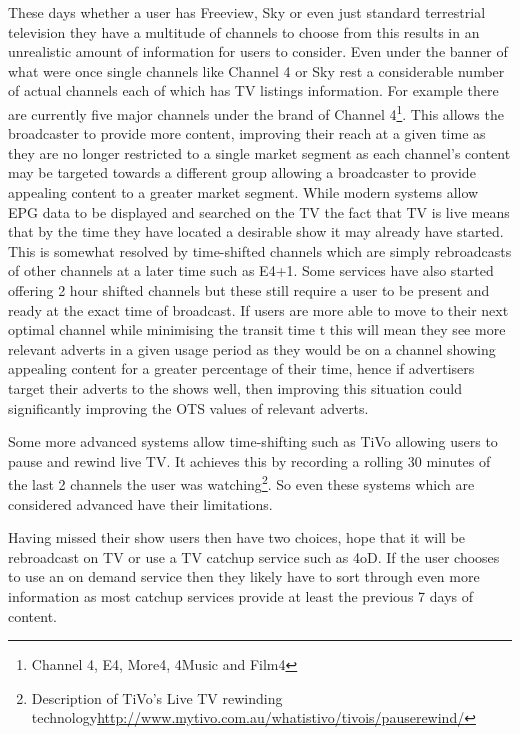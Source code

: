 These days whether a user has Freeview, Sky or even just standard terrestrial television they have a multitude of channels to choose from this results in an unrealistic amount of information for users to consider\citep{informationOverload}. Even under the banner of what were once single channels like Channel 4 or Sky rest a considerable number of actual channels each of which has TV listings information. For example there are currently five major channels under the brand of Channel 4\footnote{Channel 4, E4, More4, 4Music and Film4}. This allows the broadcaster to provide more content, improving their reach at a given time as they are no longer restricted to a single market segment as each channel's content may be targeted towards a different group allowing a broadcaster to provide appealing content to a greater market segment. While modern systems allow EPG data to be displayed and searched on the TV the fact that TV is live means that by the time they have located a desirable show it may already have started. This is somewhat resolved by time-shifted channels which are simply rebroadcasts of other channels at a later time such as E4+1. Some services have also started offering 2 hour shifted channels but these still require a user to be present and ready at the exact time of broadcast. If users are more able to move to their next optimal channel while minimising the transit time t this will mean they see more relevant adverts in a given usage period as they would be on a channel showing appealing content for a greater percentage of their time, hence if advertisers target their adverts to the shows well, then improving this situation could significantly improving the OTS values of relevant adverts.

Some more advanced systems allow time-shifting such as TiVo allowing users to pause and rewind live TV. It achieves this by recording a rolling 30 minutes of the last 2 channels the user was watching\footnote{Description of TiVo's Live TV rewinding technology\url{http://www.mytivo.com.au/whatistivo/tivois/pauserewind/}}. So even these systems which are considered advanced have their limitations.

Having missed their show users then have two choices, hope that it will be rebroadcast on TV or use a TV catchup service such as 4oD. If the user chooses to use an on demand service then they likely have to sort through even more information as most catchup services provide at least the previous 7 days of content.

